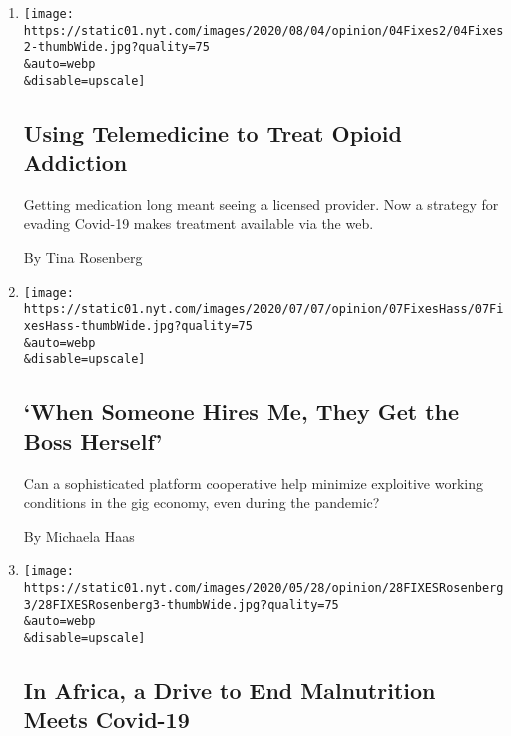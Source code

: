 \begin{enumerate}
\def\labelenumi{\arabic{enumi}.}
\item
  \href{/2020/08/04/opinion/opioid-telemedicine-covid.html}{}

  \texttt{[image: https://static01.nyt.com/images/2020/08/04/opinion/04Fixes2/04Fixes2-thumbWide.jpg?quality=75\\\&auto=webp\\\&disable=upscale]}

  \hypertarget{using-telemedicine-to-treat-opioid-addiction}{%
  \subsection{Using Telemedicine to Treat Opioid
  Addiction}\label{using-telemedicine-to-treat-opioid-addiction}}

  Getting medication long meant seeing a licensed provider. Now a
  strategy for evading Covid-19 makes treatment available via the web.

  By Tina Rosenberg
\item
  \href{/2020/07/07/opinion/gig-economy-immigrants-fair-wage.html}{}

  \texttt{[image: https://static01.nyt.com/images/2020/07/07/opinion/07FixesHass/07FixesHass-thumbWide.jpg?quality=75\\\&auto=webp\\\&disable=upscale]}

  \hypertarget{when-someone-hires-me-they-get-the-boss-herself}{%
  \subsection{`When Someone Hires Me, They Get the Boss
  Herself'}\label{when-someone-hires-me-they-get-the-boss-herself}}

  Can a sophisticated platform cooperative help minimize exploitive
  working conditions in the gig economy, even during the pandemic?

  By Michaela Haas
\item
  \href{/2020/05/28/opinion/coronavirus-africa-malnutrition.html}{}

  \texttt{[image: https://static01.nyt.com/images/2020/05/28/opinion/28FIXESRosenberg3/28FIXESRosenberg3-thumbWide.jpg?quality=75\\\&auto=webp\\\&disable=upscale]}

  \hypertarget{in-africa-a-drive-to-end-malnutrition-meets-covid-19}{%
  \subsection{In Africa, a Drive to End Malnutrition Meets
  Covid-19}\label{in-africa-a-drive-to-end-malnutrition-meets-covid-19}}


\end{enumerate}
